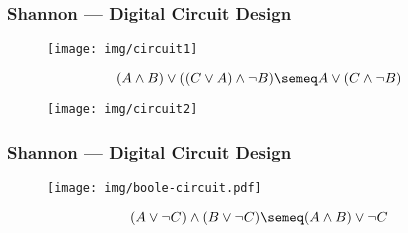 \documentclass[UTF8,aspectratio=43,11pt,colorlinks,compress,openany]{beamer}%
\begin{document}
\begin{frame}\frametitle{Shannon --- Digital Circuit Design}
	\begin{figure}[!htbp]
		\begin{center}
			\texttt{[image: img/circuit1]}
		\end{center}
	\end{figure}
	\[(A\wedge B)\vee((C\vee A)\wedge\neg B)\semeq A\vee(C\wedge\neg B)\]
	\begin{figure}[!htbp]
		\begin{center}
			\texttt{[image: img/circuit2]}
		\end{center}
	\end{figure}
\end{frame}

\begin{frame}\frametitle{Shannon --- Digital Circuit Design}
\begin{figure}
\texttt{[image: img/boole-circuit.pdf]}
\end{figure}
\[(A\vee\neg C)\wedge(B\vee\neg C)\semeq(A\wedge B)\vee\neg C\]
\end{frame}
\end{document}
